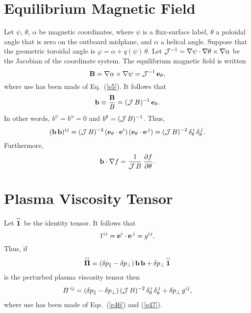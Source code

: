\documentclass[12pt,prb,aps,notitlepage]{revtex4-1}
\newcommand{\bPi}{\mbox{\boldmath$\Pi$}}
\newcommand{\smalltensor}[1]{\overset{\text{\tiny$\leftrightarrow$}}{#1}}
\begin{document}
\section{Equilibrium Magnetic Field}
Let $\psi$, $\theta$, $\alpha$ be magnetic coordinates, where $\psi$ is a flux-surface label, $\theta$ a poloidal angle that is zero on the outboard midplane, and $\alpha$
a helical angle. Suppose that the geometric toroidal angle is $\varphi = \alpha+ q(\psi)\,\theta$. 
 Let ${\cal  J}^{-1}= \nabla\psi\cdot\nabla\theta\times \nabla\alpha$ be the Jacobian of the coordinate system. The equilibrium magnetic field
is written 
\begin{equation}\label{e44}
{\bf B} =  \nabla\alpha\times\nabla\psi={\cal J}^{-1}\,{\bf e}_\theta,
\end{equation}
where use has been made of Eq.~(\ref{e5}). 
It follows that 
\begin{equation}\label{e45}
{\bf b} \equiv \frac{{\bf B}}{B}= ({\cal J}\,B)^{-1}\,{\bf e}_\theta.
\end{equation}
In other words, $b^\psi=b^\alpha=0$ and $b^\theta = ({\cal J}\,B)^{-1}$. 
Thus,
\begin{equation}\label{e46}
({\bf b}\,{\bf b})^{ij}= ({\cal J}\,B)^{-2} \,({\bf e}_\theta\cdot{\bf e}^i)\,({\bf e}_\theta\cdot{\bf e}^{\,j})=  ({\cal J}\,B)^{-2} \,\delta_\theta^{\,i}\,\delta_\theta^{\,j}.
\end{equation}
Furthermore,
\begin{equation}\label{e48a}
{\bf b}\cdot\nabla f = \frac{1}{{\cal J}\,B}\,\frac{\partial f}{\partial\theta}.
\end{equation}

\section{Plasma Viscosity Tensor}
Let $\smalltensor{\bf 1}$ be the identity tensor. It follows that
\begin{equation}\label{e47}
1^{ij}= {\bf e}^i\cdot{\bf e}^{\,j} = g^{ij}.
\end{equation}
Thus, if 
\begin{equation}
\smalltensor{\bPi}= (\delta p_\parallel-\delta p_\perp)\,{\bf b}\,{\bf b} + \delta p_\perp\,\smalltensor{\bf 1}
\end{equation}
is the perturbed plasma viscosity tensor then
\begin{equation}\label{e48}
{\mit\Pi}^{\,ij} = (\delta p_\parallel-\delta p_\perp)\,({\cal J}\,B)^{-2} \,\delta_\theta^{\,i}\,\delta_\theta^{\,j} +\delta p_\perp\,g^{ij},
\end{equation}
where use has been made of Eqs.~(\ref{e46}) and (\ref{e47}). 
\end{document}

